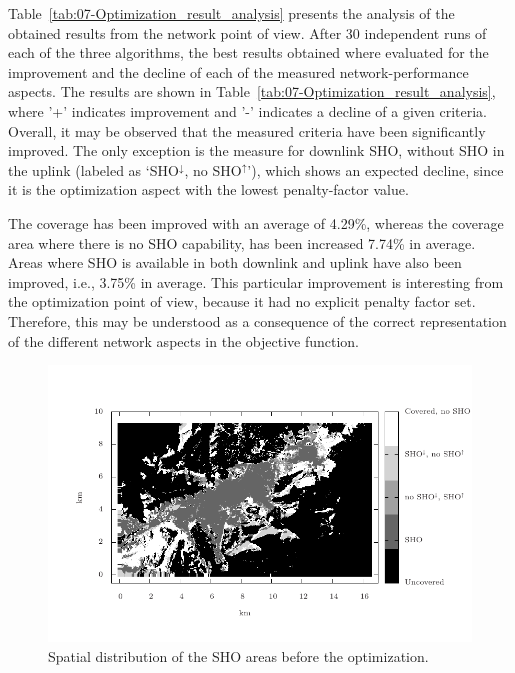 Table~\ref{tab:07-Optimization_result_analysis} presents the analysis
of the obtained results from the network point of view. After 30 independent
runs of each of the three algorithms, the best results obtained where
evaluated for the improvement and the decline of each of the measured
network-performance aspects. The results are shown in Table~\ref{tab:07-Optimization_result_analysis},
where '+' indicates improvement and '-' indicates a decline of a given
criteria. Overall, it may be observed that the measured criteria have
been significantly improved. The only exception is the measure for
downlink SHO, without SHO in the uplink (labeled as `SHO$^{\downarrow}$,
no SHO$^{\uparrow}$'), which shows an expected decline, since it
is the optimization aspect with the lowest penalty-factor value.

The coverage has been improved with an average of 4.29\%, whereas
the coverage area where there is no SHO capability, has been increased
7.74\% in average. Areas where SHO is available in both downlink and
uplink have also been improved, i.e., 3.75\% in average. This particular
improvement is interesting from the optimization point of view, because
it had no explicit penalty factor set. Therefore, this may be understood
as a consequence of the correct representation of the different network
aspects in the objective function.

\begin{figure}[H]
\centering

\includegraphics[width=1\textwidth]{07-experimental_evaluation-sho_balancing/img/sho_areas_initial}

\caption{Spatial distribution of the SHO areas before the optimization.\label{fig:07-SHO_areas_initial}}
\end{figure}


